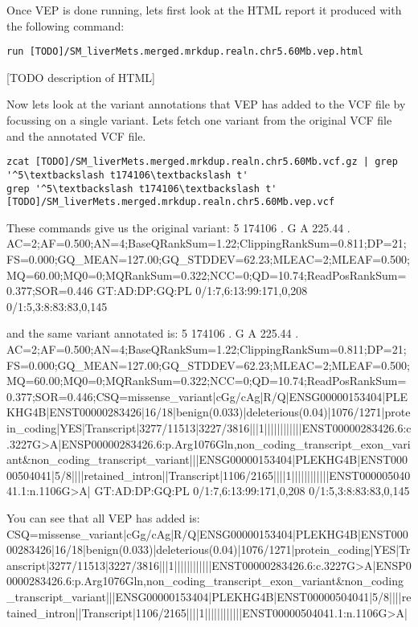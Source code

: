 \begin{steps}
Once VEP is done running, lets first look at the HTML report it produced with the following command:
\begin{lstlisting}
run [TODO]/SM_liverMets.merged.mrkdup.realn.chr5.60Mb.vep.html
\end{lstlisting}
\end{steps}

[TODO description of HTML]

\begin{steps}
Now lets look at the variant annotations that VEP has added to the VCF file by focussing on a single variant. Lets fetch one variant from the original VCF file and the annotated VCF file.
\begin{lstlisting}
zcat [TODO]/SM_liverMets.merged.mrkdup.realn.chr5.60Mb.vcf.gz | grep '^5\textbackslash t174106\textbackslash t'
grep '^5\textbackslash t174106\textbackslash t' [TODO]/SM_liverMets.merged.mrkdup.realn.chr5.60Mb.vep.vcf
\end{lstlisting}
\end{steps}

These commands give us the original variant:
5	174106	.	G	A	225.44	.	AC=2;AF=0.500;AN=4;BaseQRankSum=1.22;ClippingRankSum=0.811;DP=21;FS=0.000;GQ_MEAN=127.00;GQ_STDDEV=62.23;MLEAC=2;MLEAF=0.500;MQ=60.00;MQ0=0;MQRankSum=0.322;NCC=0;QD=10.74;ReadPosRankSum=0.377;SOR=0.446	GT:AD:DP:GQ:PL	0/1:7,6:13:99:171,0,208	0/1:5,3:8:83:83,0,145

and the same variant annotated is:
5	174106	.	G	A	225.44	.	AC=2;AF=0.500;AN=4;BaseQRankSum=1.22;ClippingRankSum=0.811;DP=21;FS=0.000;GQ_MEAN=127.00;GQ_STDDEV=62.23;MLEAC=2;MLEAF=0.500;MQ=60.00;MQ0=0;MQRankSum=0.322;NCC=0;QD=10.74;ReadPosRankSum=0.377;SOR=0.446;CSQ=missense_variant|cGg/cAg|R/Q|ENSG00000153404|PLEKHG4B|ENST00000283426|16/18|benign(0.033)|deleterious(0.04)|1076/1271|protein_coding|YES|Transcript|3277/11513|3227/3816|||1||||||||||||ENST00000283426.6:c.3227G>A|ENSP00000283426.6:p.Arg1076Gln,non_coding_transcript_exon_variant&non_coding_transcript_variant|||ENSG00000153404|PLEKHG4B|ENST00000504041|5/8||||retained_intron||Transcript|1106/2165||||1||||||||||||ENST00000504041.1:n.1106G>A|	GT:AD:DP:GQ:PL	0/1:7,6:13:99:171,0,208	0/1:5,3:8:83:83,0,145

You can see that all VEP has added is:
CSQ=missense_variant|cGg/cAg|R/Q|ENSG00000153404|PLEKHG4B|ENST00000283426|16/18|benign(0.033)|deleterious(0.04)|1076/1271|protein_coding|YES|Transcript|3277/11513|3227/3816|||1||||||||||||ENST00000283426.6:c.3227G>A|ENSP00000283426.6:p.Arg1076Gln,non_coding_transcript_exon_variant&non_coding_transcript_variant|||ENSG00000153404|PLEKHG4B|ENST00000504041|5/8||||retained_intron||Transcript|1106/2165||||1||||||||||||ENST00000504041.1:n.1106G>A|

